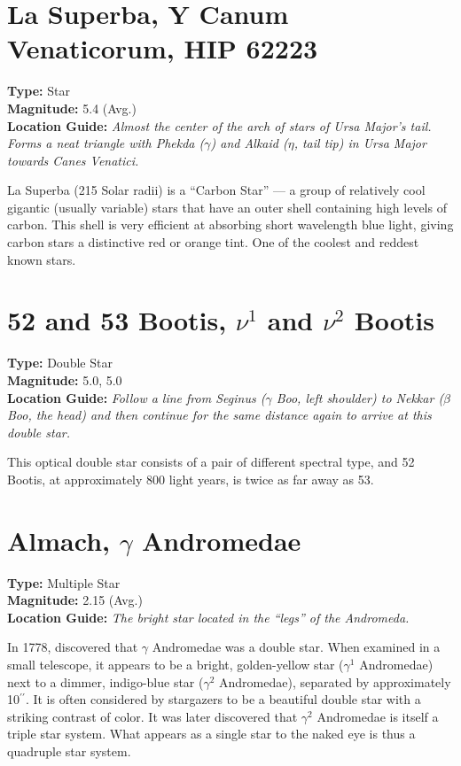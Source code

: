 \section{La Superba, Y Canum Venaticorum, HIP 62223}
\textbf{Type:} Star \\
\textbf{Magnitude:} 5.4 (Avg.) \\
\textbf{Location Guide:} \textit{Almost the center of the arch of stars of Ursa Major's tail. Forms a neat triangle with Phekda ($\gamma$) and Alkaid ($\eta$, tail tip) in Ursa Major towards Canes Venatici.} 

La Superba (215 Solar radii) is a ``Carbon Star'' --- a group of relatively cool gigantic (usually variable) stars that have an outer shell containing high levels of carbon. This shell is very efficient at absorbing short wavelength blue light, giving carbon stars a distinctive red or orange tint. One of the coolest and reddest known stars.

\section{52 and 53 Bootis, \texorpdfstring{$\nu^1$ and $\nu^2$}{nu1 and nu2} Bootis} 
\textbf{Type:} Double Star \\
\textbf{Magnitude:} 5.0, 5.0 \\
\textbf{Location Guide:} \textit{Follow a line from Seginus ($\gamma$ Boo, left shoulder) to Nekkar ($\beta$ Boo, the head) and then continue for the same distance again to arrive at this double star.} 

This optical double star consists of a pair of different spectral type, and 52 Bootis, at approximately 800 light years, is twice as far away as 53.

\section{Almach, \texorpdfstring{$\gamma$}{\gamma} Andromedae} 
\textbf{Type:} Multiple Star \\
\textbf{Magnitude:} 2.15 (Avg.) \\
\textbf{Location Guide:} \textit{The bright star located in the ``legs'' of the Andromeda.} 

In 1778,  discovered that $\gamma$ Andromedae was a double star. When examined in a small telescope, it appears to be a bright, golden-yellow star ($\gamma^1$ Andromedae) next to a dimmer, indigo-blue star ($\gamma^2$ Andromedae), separated by approximately 10$^{\prime\prime}$. It is often considered by stargazers to be a beautiful double star with a striking contrast of color. It was later discovered that $\gamma^2$ Andromedae is itself a triple star system. What appears as a single star to the naked eye is thus a quadruple star system.

